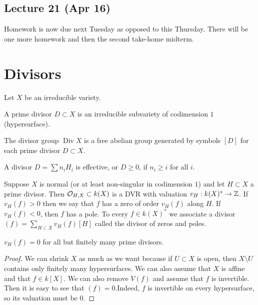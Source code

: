 \documentclass[twoside, 10pt]{article}
\begin{document}
        \subsection{Lecture 21 (Apr 16)} Homework is now due next Tuesday as
        opposed to this Thursday. There will be one more homework and then the
        second take-home midterm.
        
        \section{Divisors} Let $X$ be an irreducible variety.

        \begin{defn} A prime divisor $D \subset X$ is an
        irreducible subvariety of codimension $1$ (hypersurface).  \end{defn}

        \begin{defn} The divisor group $\operatorname{Div} X$ is
        a free abelian group generated by symbols $[D]$ for each prime divisor
    $D \subset X$.  \end{defn}

        \begin{defn} A divisor $D = \sum n_i H_i$ is effective, or $D \geq 0$,
        if $n_i \geq i$ for all $i$.  \end{defn}

        Suppose $X$ is normal (or at least non-singular in codimension $1$) and
        let $H \subset X$ a prime divisor. Then $\mathcal{O}_{H,X} \subset k(X)$ is
        a DVR with valuation $v_H: k(X)^* \to \mathbb{Z}$. If $v_H(f) > 0$ then we say
        that $f$ has a zero of order $v_H(f)$ along $H$. If $v_H(f) < 0$, then
        $f$ has a pole. To every $f \in k(X)^*$ we associate a divisor $(f) =
        \sum_{H \subset X} v_H(f)[H]$ called the divisor of zeros and poles.

        \begin{lem} $v_H(f) = 0$ for all but finitely many prime divisors.
            \begin{proof} We can shrink $X$ as much as we want because if $U
                \subset X$ is open, then $X \setminus  U$ contains only
                finitely many hypersurfaces. We can also assume that $X$ is
                affine and that $f \in k[X]$. We can also remove $V(f)$ and
            assume that $f$ is invertible. Then it is easy to see that $(f) =
        0$.Indeed, $f$ is invertible on every hypersurface, so its valuation
    must be $0$.  \end{proof} \end{lem}
\end{document}
